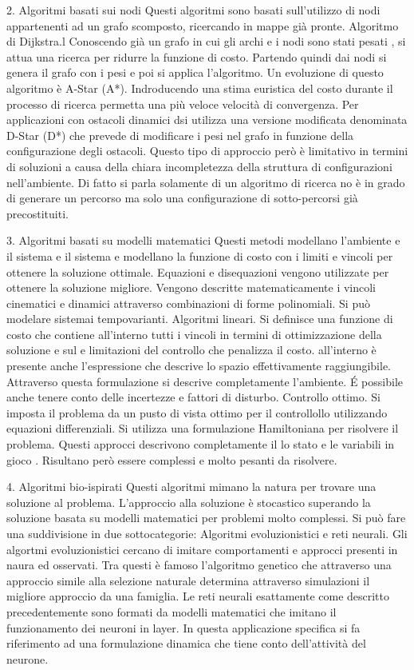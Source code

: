 \begin{idee}
		
	2. Algoritmi basati sui nodi
		Questi algoritmi sono basati sull'utilizzo di nodi appartenenti ad un grafo scomposto, ricercando in mappe già pronte.
		Algoritmo di Dijkstra.l Conoscendo già un grafo in cui gli archi e i nodi sono stati pesati , si attua una ricerca per ridurre la funzione di costo. Partendo quindi dai nodi si genera il grafo con i pesi e poi si applica l'algoritmo. Un evoluzione di questo algoritmo è A-Star (A*). Indroducendo una stima euristica del costo durante il processo di ricerca permetta una più veloce velocità di convergenza. Per applicazioni con ostacoli dinamici dsi utilizza una versione modificata denominata D-Star (D*) che prevede di modificare i pesi nel grafo in funzione della configurazione degli ostacoli. Questo tipo di approccio però è limitativo in termini di soluzioni a causa della chiara incompletezza della struttura di configurazioni nell'ambiente. Di fatto si parla solamente di un algoritmo di ricerca no è in grado di generare un percorso ma solo una configurazione di sotto-percorsi già precostituiti.
		
	3. Algoritmi basati su modelli matematici
		Questi metodi modellano l'ambiente  e il sistema e il sistema e modellano la funzione di costo con i limiti e vincoli per ottenere la soluzione ottimale. Equazioni e disequazioni vengono utilizzate per ottenere la soluzione migliore.
		Vengono descritte matematicamente i vincoli cinematici e dinamici attraverso combinazioni di forme polinomiali. Si può modelare sistemai tempovarianti. 
		Algoritmi lineari. Si definisce una funzione di costo che contiene all'interno tutti i vincoli in termini di ottimizzazione della soluzione e sul e limitazioni del controllo che penalizza il costo. all'interno è presente anche l'espressione che descrive lo spazio effettivamente raggiungibile. Attraverso questa formulazione si descrive completamente l'ambiente. \'E possibile anche tenere conto delle incertezze e fattori di disturbo.
		Controllo ottimo. Si imposta il problema da un pusto di vista ottimo per il controllollo utilizzando equazioni differenziali. Si utilizza una formulazione Hamiltoniana per risolvere il problema. 
		Questi approcci descrivono completamente il lo stato e le variabili in gioco . Risultano però essere complessi e molto pesanti da risolvere.
	
	4. Algoritmi bio-ispirati
		Questi algoritmi mimano la natura per trovare una soluzione al problema. L'approccio alla soluzione è stocastico superando la soluzione basata su modelli matematici per problemi molto complessi.
		Si può fare una suddivisione in due sottocategorie: Algoritmi evoluzionistici e reti neurali.
		Gli algortmi evoluzionistici cercano di imitare comportamenti e approcci presenti in naura ed osservati. Tra questi è famoso l'algoritmo genetico che attraverso una approccio simile alla selezione naturale determina attraverso simulazioni il migliore approccio da una famiglia.
		Le reti neurali esattamente come descritto precedentemente sono formati da modelli matematici che imitano il funzionamento dei neuroni in layer. In questa applicazione specifica si fa riferimento ad una formulazione dinamica che tiene conto dell'attività del neurone.
		

\end{idee}
